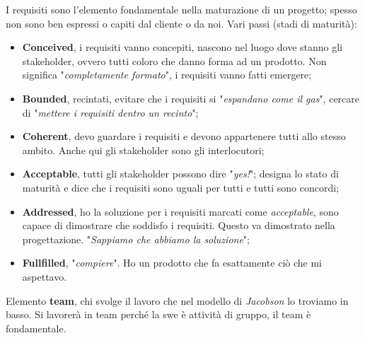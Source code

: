 
I requisiti sono l'elemento fondamentale nella maturazione di un progetto; spesso non sono ben espressi o capiti dal cliente o da noi. Vari passi (stadi di maturità):

\begin{itemize}

	\item \textbf{Conceived}, i requisiti vanno concepiti, nascono nel luogo dove stanno gli stakeholder, ovvero tutti coloro che danno forma ad un prodotto. Non significa "\textit{completamente formato}", i requisiti vanno fatti emergere;
	
	\item \textbf{Bounded}, recintati, evitare che i requisiti si "\textit{espandano come il gas}", cercare di "\textit{mettere i requisiti dentro un recinto}";
	
	\item \textbf{Coherent}, devo guardare i requisiti e devono appartenere tutti allo stesso ambito. Anche qui gli stakeholder sono gli interlocutori;
	
	\item \textbf{Acceptable}, tutti gli stakeholder possono dire "\textit{yes!}"; designa lo stato di maturità e dice che i requisiti sono uguali per tutti e tutti sono concordi;
	
	\item \textbf{Addressed}, ho la soluzione per i requisiti marcati come \textit{acceptable}, sono capace di dimostrare che soddisfo i requisiti. Questo va dimostrato nella progettazione. "\textit{Sappiamo che abbiamo la soluzione}";
	
	\item \textbf{Fullfilled}, "\textit{compiere}". Ho un prodotto che fa esattamente ciò che mi aspettavo.

\end{itemize}

Elemento \textbf{team}, chi svolge il lavoro che nel modello di \textit{Jacobson} lo troviamo in basso. Si lavorerà in team perché la swe è attività di gruppo, il team è fondamentale.

